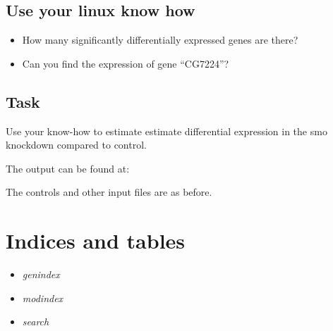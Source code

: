 \documentclass[letterpaper,10pt,english]{sphinxmanual}
\begin{document}
\section{Use your linux know how}
\label{STEP4_CUFFLINKS_DE:use-your-linux-know-how}\begin{itemize}
\item {} 
How many significantly differentially expressed genes are there?

\item {} 
Can you find the expression of gene ``CG7224''?

\end{itemize}


\section{Task}
\label{STEP4_CUFFLINKS_DE:id1}
Use your know-how to estimate estimate differential expression in the smo knockdown compared to control.

The output can be found at: 

The controls and other input files are as before.


\chapter{Indices and tables}
\label{IntroToCommandLine:indices-and-tables}\begin{itemize}
\item {} 
\emph{genindex}

\item {} 
\emph{modindex}

\item {} 
\emph{search}

\end{itemize}



\renewcommand{\indexname}{Index}
\printindex
\end{document}
